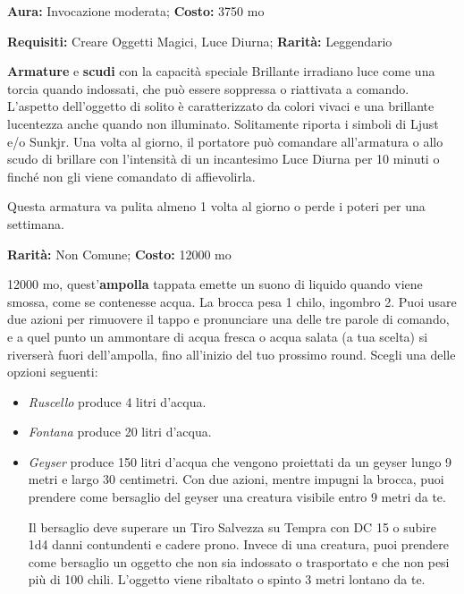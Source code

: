\begin{multicols}{2}

\textbf{Aura:} Invocazione moderata; \textbf{Costo:} 3750 mo

\textbf{Requisiti:} Creare Oggetti Magici, Luce Diurna; \textbf{Rarità:} Leggendario

\textbf{Armature} e \textbf{scudi} con la capacità speciale Brillante irradiano luce come una torcia quando indossati, che può essere soppressa o riattivata a comando. L'aspetto dell'oggetto di solito è caratterizzato da colori vivaci e una brillante lucentezza anche quando non illuminato. Solitamente riporta i simboli di Ljust e/o Sunkjr. Una volta al giorno, il portatore può comandare all'armatura o allo scudo di brillare con l'intensità di un incantesimo Luce Diurna per 10 minuti o finché non gli viene comandato di affievolirla.

Questa armatura va pulita almeno 1 volta al giorno o perde i poteri per una settimana.


\textbf{Rarità:} Non Comune; \textbf{Costo:} 12000 mo

12000 mo, quest'\textbf{ampolla} tappata emette un suono di liquido quando viene smossa, come se contenesse acqua. La brocca pesa 1 chilo, ingombro 2. Puoi usare due azioni per rimuovere il tappo e pronunciare una delle tre parole di comando, e a quel punto un ammontare di acqua fresca o acqua salata (a tua scelta) si riverserà fuori dell'ampolla, fino all'inizio del tuo prossimo round. Scegli una delle opzioni seguenti:

\begin{itemize}[leftmargin=*] \setlength{\itemsep}{0pt}
\item
\emph{Ruscello} produce 4 litri d'acqua.
\item
\emph{Fontana} produce 20 litri d'acqua.
\item
\emph{Geyser} produce 150 litri d'acqua che vengono proiettati da un geyser lungo 9 metri e largo 30 centimetri. Con due azioni, mentre impugni la brocca, puoi prendere come bersaglio del geyser una creatura visibile entro 9 metri da te.

Il bersaglio deve superare un Tiro Salvezza su Tempra con DC 15 o subire 1d4 danni contundenti e cadere prono. Invece di una creatura, puoi prendere come bersaglio un oggetto che non sia indossato o trasportato e che non pesi più di 100 chili. L'oggetto viene ribaltato o spinto 3 metri lontano da te.
\end{itemize}


\end{multicols}
